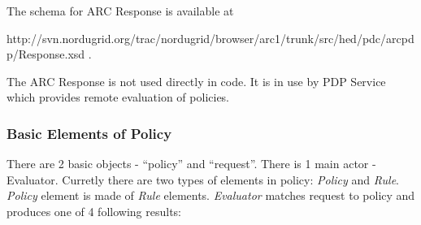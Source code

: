 \documentclass{article}                            %
\begin{document}
The schema for ARC Response is available at

http://svn.nordugrid.org/trac/nordugrid/browser/arc1/trunk/src/hed/pdc/arcpdp/Response.xsd .

The ARC Response is not used directly in code. It is in use by PDP Service which provides remote evaluation of policies.


\subsubsection{Basic Elements of Policy} %
\label{subsubsec:poicy_element}
There are 2 basic objects - ``policy'' and ``request''. There is 1 main actor - Evaluator. Curretly there are two types of elements in policy: \textit{Policy} and \textit{Rule}. \textit{Policy} element is made of \textit{Rule} elements.
\textit{Evaluator} matches request to policy and produces one of 4 following results:
\end{document}
